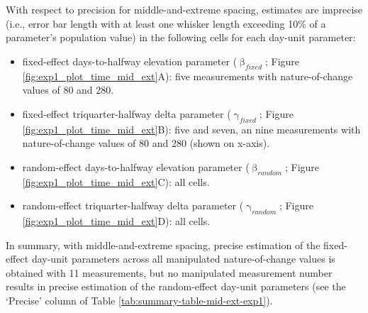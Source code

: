 \documentclass[
12pt, %
twoside,
english]{guelphthesis}
\theoremstyle{definition}
\theoremstyle{definition}
\theoremstyle{definition}
\theoremstyle{definition}
\theoremstyle{remark}
\begin{document}
With respect to precision for middle-and-extreme spacing, estimates are imprecise (i.e., error bar length with at least one whisker length exceeding 10\% of a parameter's population value) in the following cells for each day-unit parameter:
\begin{itemize}
\tightlist
\item
  fixed-effect days-to-halfway elevation parameter (\(\upbeta_{fixed}\); Figure \ref{fig:exp1_plot_time_mid_ext}A): five measurements with nature-of-change values of 80 and 280.
\item
  fixed-effect triquarter-halfway delta parameter (\(\upgamma_{fixed}\); Figure \ref{fig:exp1_plot_time_mid_ext}B): five and seven, an nine measurements with nature-of-change values of 80 and 280 (shown on x-axis).
\item
  random-effect days-to-halfway elevation parameter (\(\upbeta_{random}\); Figure \ref{fig:exp1_plot_time_mid_ext}C): all cells.
\item
  random-effect triquarter-halfway delta parameter (\(\upgamma_{random}\); Figure \ref{fig:exp1_plot_time_mid_ext}D): all cells.
\end{itemize}
\noindent In summary, with middle-and-extreme spacing, precise estimation of the fixed-effect day-unit parameters across all manipulated nature-of-change values is obtained with 11 measurements, but no manipulated measurement number results in precise estimation of the random-effect day-unit parameters (see the `Precise' column of Table \ref{tab:summary-table-mid-ext-exp1}).
\end{document}
